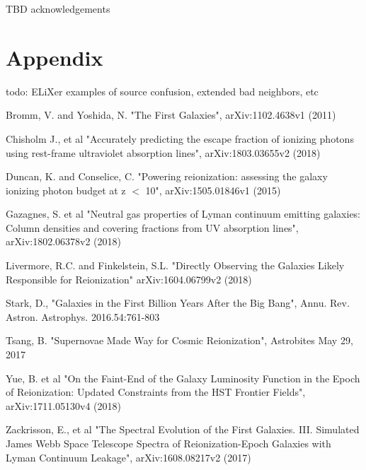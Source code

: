 \documentclass{aastex62}
\begin{document}
TBD acknowledgements


\appendix

\section{Appendix}
{ \color{red} todo: ELiXer examples of source confusion, extended bad neighbors, etc}

\begin{thebibliography}{}
Bromm, V. and Yoshida, N. "The First Galaxies", arXiv:1102.4638v1 (2011)

Chisholm J., et al "Accurately predicting the escape fraction of ionizing photons using rest-frame ultraviolet absorption lines", arXiv:1803.03655v2 (2018)

Duncan, K. and Conselice, C. "Powering reionization: assessing the galaxy ionizing photon budget at z $<$ 10", arXiv:1505.01846v1 (2015)

Gazagnes, S. et al "Neutral gas properties of Lyman continuum emitting galaxies: Column densities and covering fractions from UV absorption lines", arXiv:1802.06378v2 (2018)

Livermore, R.C. and Finkelstein, S.L. "Directly Observing the Galaxies Likely Responsible for Reionization" arXiv:1604.06799v2 (2018)

Stark, D., "Galaxies in the First Billion Years After the Big Bang", Annu. Rev. Astron. Astrophys. 2016.54:761-803

Tsang, B. "Supernovae Made Way for Cosmic Reionization", Astrobites May 29, 2017

Yue, B. et al "On the Faint-End of the Galaxy Luminosity Function in the Epoch of Reionization: Updated Constraints from the HST Frontier Fields", arXiv:1711.05130v4 (2018)

Zackrisson, E., et al "The Spectral Evolution of the First Galaxies. III. Simulated James Webb Space Telescope Spectra of Reionization-Epoch Galaxies with Lyman Continuum Leakage", arXiv:1608.08217v2 (2017)

\end{thebibliography}




\end{document}
